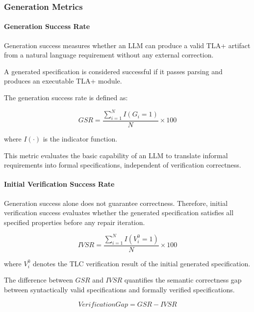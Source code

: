 \subsubsection{Generation Metrics}

\paragraph{Generation Success Rate}

Generation success measures whether an LLM can produce a valid TLA+ artifact from
a natural language requirement without any external correction.

A generated specification is considered successful if it passes parsing and
produces an executable TLA+ module.

The generation success rate is defined as:

\begin{equation}
GSR =
\frac{\sum_{i=1}^{N} I(G_i=1)}
{N}
\times 100
\end{equation}

where $I(\cdot)$ is the indicator function.

This metric evaluates the basic capability of an LLM to translate informal
requirements into formal specifications, independent of verification correctness.

\paragraph{Initial Verification Success Rate}

Generation success alone does not guarantee correctness. Therefore, initial
verification success evaluates whether the generated specification satisfies all
specified properties before any repair iteration.

\begin{equation}
IVSR =
\frac{\sum_{i=1}^{N} I(V_i^{0}=1)}
{N}
\times 100
\end{equation}

where $V_i^{0}$ denotes the TLC verification result of the initial generated
specification.

The difference between $GSR$ and $IVSR$ quantifies the semantic correctness gap
between syntactically valid specifications and formally verified specifications.

\begin{equation}
VerificationGap = GSR - IVSR
\end{equation}

